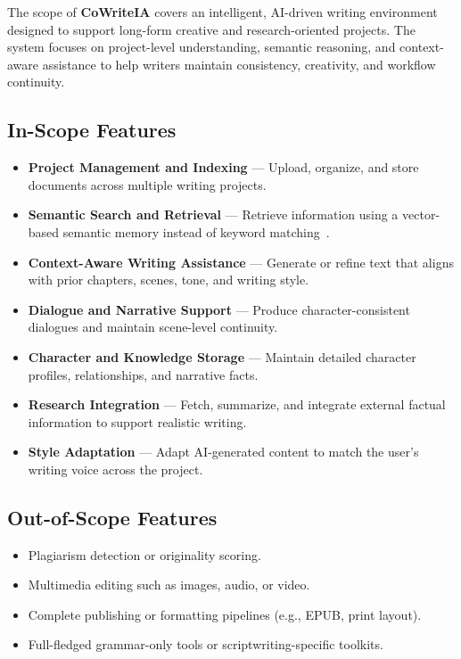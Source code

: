 The scope of \textbf{CoWriteIA} covers an intelligent, AI-driven writing environment designed to support long-form creative and research-oriented projects. The system focuses on project-level understanding, semantic reasoning, and context-aware assistance to help writers maintain consistency, creativity, and workflow continuity.

\subsection*{In-Scope Features}

\begin{itemize}
    \item \textbf{Project Management and Indexing} — Upload, organize, and store documents across multiple writing projects.
    
    \item \textbf{Semantic Search and Retrieval} — Retrieve information using a vector-based semantic memory instead of keyword matching~\cite{reimers2019sentencebert,khattab2020colbert}.
    
    \item \textbf{Context-Aware Writing Assistance} — Generate or refine text that aligns with prior chapters, scenes, tone, and writing style.
    
    \item \textbf{Dialogue and Narrative Support} — Produce character-consistent dialogues and maintain scene-level continuity.
    
    \item \textbf{Character and Knowledge Storage} — Maintain detailed character profiles, relationships, and narrative facts.
    
    \item \textbf{Research Integration} — Fetch, summarize, and integrate external factual information to support realistic writing.
    
    \item \textbf{Style Adaptation} — Adapt AI-generated content to match the user’s writing voice across the project.
\end{itemize}

\subsection*{Out-of-Scope Features}

\begin{itemize}
    \item Plagiarism detection or originality scoring.
    \item Multimedia editing such as images, audio, or video.
    \item Complete publishing or formatting pipelines (e.g., EPUB, print layout).
    \item Full-fledged grammar-only tools or scriptwriting-specific toolkits.
\end{itemize}

